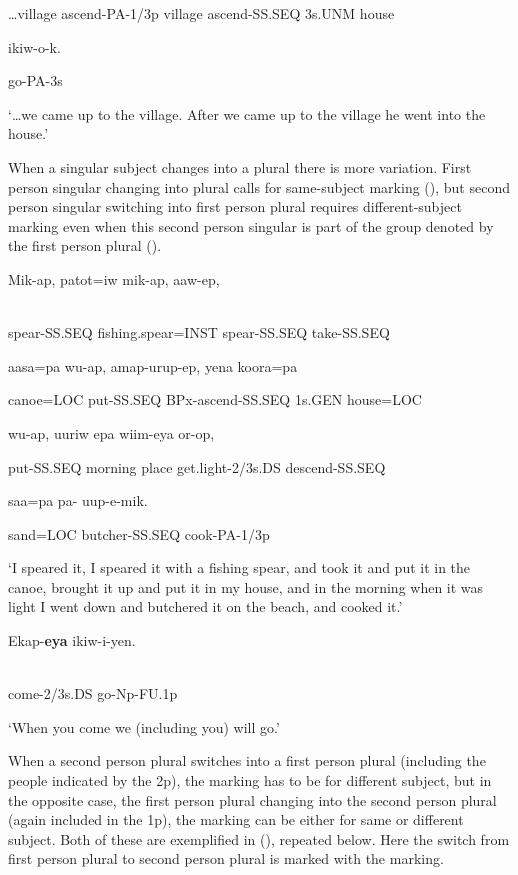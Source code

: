 {\dots}village  ascend-PA-1/3p  village  ascend-SS.SEQ  3s.UNM  house

ikiw-o-k.

go-PA-3s

`{\dots}we came up to the village. After we came up to the village he went into the house.'

When a singular subject changes into a plural there is more variation. First person singular changing into plural calls for same-subject marking (), but second person singular switching into first person plural requires different-subject marking even when this second person singular is part of the group denoted by the first person plural (). 

\ea%
\label{ex:x1435}
\gll Mik-ap,  patot=iw  mik-ap,  aaw-ep,  \\
      \\
\glt
\z

spear-SS.SEQ  fishing.spear=INST  spear-SS.SEQ  take-SS.SEQ

aasa=pa  wu-ap,  amap-urup-ep,  yena  koora=pa

canoe=LOC  put-SS.SEQ  BPx-ascend-SS.SEQ  1s.GEN  house=LOC

wu-ap,  uuriw  epa  wiim-eya  or-op,  

put-SS.SEQ  morning  place  get.light-2/3s.DS  descend-SS.SEQ 

saa=pa  pa-  uup-e-mik.

sand=LOC  butcher-SS.SEQ  cook-PA-1/3p

`I speared it, I speared it with a fishing spear, and took it and put it in the canoe, brought it up and put it in my house, and in the morning when it was light I went down and butchered it on the beach, and  cooked it.'

\ea%
\label{ex:x1439}
\gll Ekap-\textbf{eya}  ikiw-i-yen. \\
      \\
\glt
\z

come-2/3s.DS  go-Np-FU.1p

`When you come we (including you) will go.'

When a second person plural switches into a first person plural (including the people indicated by the 2p), the marking has to be for different subject, but in the opposite case, the first person plural changing into the second person plural (again included in the 1p), the marking can be either for same or different subject. Both of these are exemplified in (), repeated below. Here the switch from first person plural to second person plural is marked with the  marking.

